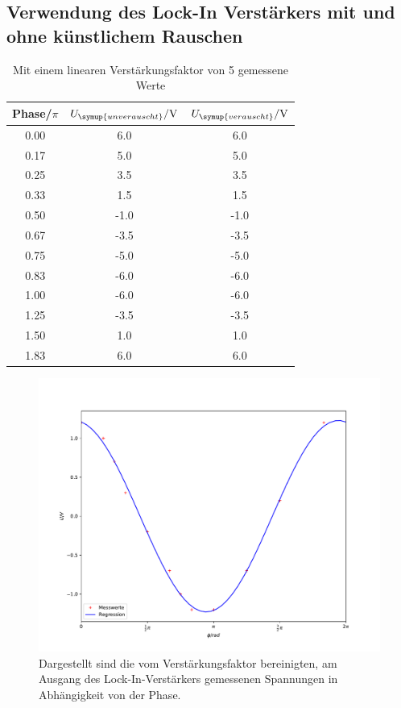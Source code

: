 \subsection{Verwendung des Lock-In Verstärkers mit und ohne künstlichem Rauschen}
\begin{table}
  \centering
  \caption{Mit einem linearen Verstärkungsfaktor von 5 gemessene Werte}
  \label{tab:1}
  \begin{tabular}{c c c}
    \toprule
    Phase/$\si{\pi}$ & $U_{\symup{unverauscht}}/\si{\volt}$ & $U_{\symup{verauscht}}/\si{\volt}$ \\
    \midrule
    0.00 & 6.0 & 6.0 \\
    0.17 & 5.0 & 5.0 \\
    0.25 & 3.5 & 3.5 \\
    0.33 & 1.5 & 1.5 \\
    0.50 & -1.0 & -1.0 \\
    0.67 & -3.5 & -3.5 \\
    0.75 & -5.0 & -5.0 \\
    0.83 & -6.0 & -6.0 \\
    1.00 & -6.0 & -6.0 \\
    1.25 & -3.5 & -3.5 \\
    1.50 & 1.0 & 1.0 \\
    1.83 & 6.0 & 6.0 \\
    \bottomrule
  \end{tabular}
\end{table}
\begin{figure}
  \centering
     \includegraphics[scale=0.6]{UvonPhi.pdf}
  \caption{Dargestellt sind die vom Verstärkungsfaktor bereinigten, am Ausgang des
  Lock-In-Verstärkers gemessenen Spannungen in Abhängigkeit von der Phase.}
  \label{plot:1}
\end{figure}
